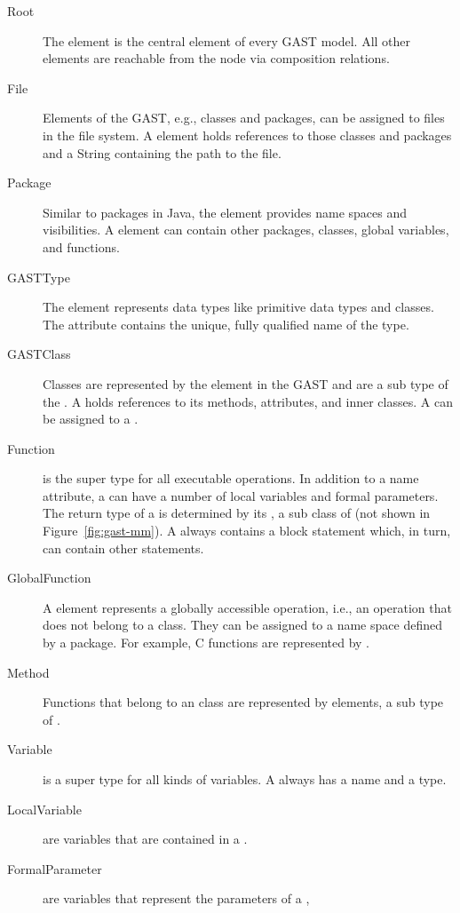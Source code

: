 \begin{description}
\item[Root] The  element is the central element of every GAST model. All other elements are reachable from the  node via composition relations.
\item[File] Elements of the GAST, e.g., classes and packages, can be assigned to files in the file system. A  element holds references to those classes and packages and a String containing the path to the file.
\item[Package] Similar to packages in Java, the  element provides name spaces and visibilities. A  element can contain other packages, classes, global variables, and functions.
\item[GASTType] The  element represents data types like primitive data types and classes. The attribute  contains the unique, fully qualified name of the type.
\item[GASTClass] Classes are represented by the element  in the GAST and are a sub type of the . A  holds references to its methods, attributes, and inner classes. A  can be assigned to a .
\item[Function]  is the super type for all executable operations. In addition to a name attribute, a  can have a number of local variables and formal parameters. The return type of a  is determined by its , a sub class of  (not shown in Figure~\ref{fig:gast-mm}). A  always contains a block statement which, in turn, can contain other statements.
\item[GlobalFunction] A  element represents a globally accessible operation, i.e., an operation that does not belong to a class. They can be assigned to a name space defined by a package. For example, C functions are represented by .
\item[Method] Functions that belong to an class are represented by  elements, a sub type of .
\item[Variable]  is a super type for all kinds of variables. A  always has a name and a type.
\item[LocalVariable]  are variables that are contained in a .
\item[FormalParameter]  are variables that represent the parameters of a ,

\end{description}
